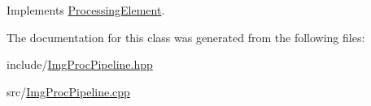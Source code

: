 \-Implements \hyperlink{classProcessingElement_ad231c2198b3c9bbc562328ee84a972ce}{\-Processing\-Element}.



\-The documentation for this class was generated from the following files\-:\begin{DoxyCompactItemize}
\item 
include/\hyperlink{ImgProcPipeline_8hpp}{\-Img\-Proc\-Pipeline.\-hpp}\item 
src/\hyperlink{ImgProcPipeline_8cpp}{\-Img\-Proc\-Pipeline.\-cpp}\end{DoxyCompactItemize}
